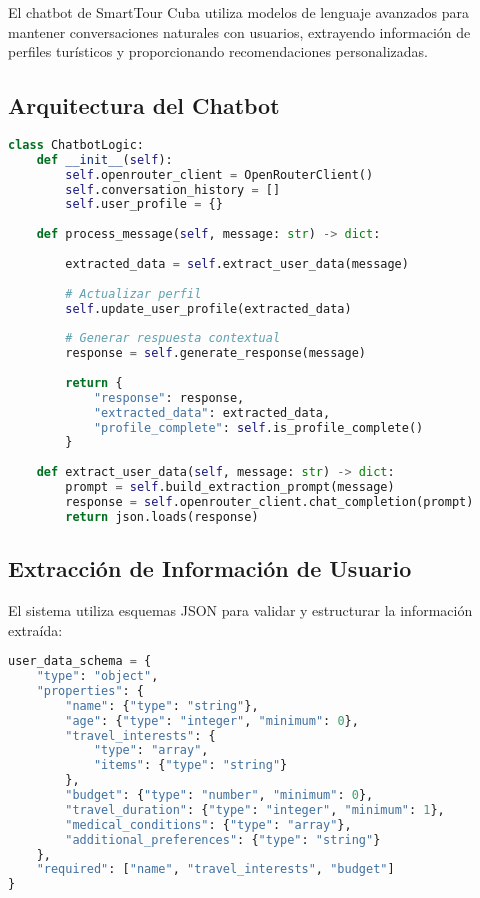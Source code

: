 \documentclass[runningheads]{llncs}
\begin{document}
El chatbot de SmartTour Cuba utiliza modelos de lenguaje avanzados para mantener conversaciones naturales con usuarios, extrayendo información de perfiles turísticos y proporcionando recomendaciones personalizadas.

\subsection{Arquitectura del Chatbot}

\begin{lstlisting}[language=Python, caption=Estructura del chatbot]
class ChatbotLogic:
    def __init__(self):
        self.openrouter_client = OpenRouterClient()
        self.conversation_history = []
        self.user_profile = {}
        
    def process_message(self, message: str) -> dict:
   
        extracted_data = self.extract_user_data(message)
        
        # Actualizar perfil
        self.update_user_profile(extracted_data)
        
        # Generar respuesta contextual
        response = self.generate_response(message)
        
        return {
            "response": response,
            "extracted_data": extracted_data,
            "profile_complete": self.is_profile_complete()
        }
        
    def extract_user_data(self, message: str) -> dict:
        prompt = self.build_extraction_prompt(message)
        response = self.openrouter_client.chat_completion(prompt)
        return json.loads(response)
\end{lstlisting}

\subsection{Extracción de Información de Usuario}

El sistema utiliza esquemas JSON para validar y estructurar la información extraída:

\begin{lstlisting}[language=Python, caption=Esquema de validación de datos]
user_data_schema = {
    "type": "object",
    "properties": {
        "name": {"type": "string"},
        "age": {"type": "integer", "minimum": 0},
        "travel_interests": {
            "type": "array",
            "items": {"type": "string"}
        },
        "budget": {"type": "number", "minimum": 0},
        "travel_duration": {"type": "integer", "minimum": 1},
        "medical_conditions": {"type": "array"},
        "additional_preferences": {"type": "string"}
    },
    "required": ["name", "travel_interests", "budget"]
}
\end{lstlisting}
\end{document}
